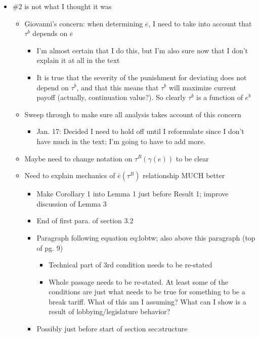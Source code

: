 \documentclass[12pt]{article}
\newcommand{\ov}{\overline}
\newcommand{\ga}{\gamma}
\begin{document}
\begin{itemize}
	\item $\#2$ is not what I thought it was
		\begin{itemize}
			\item Giovanni's concern: when determining $\ov{e}$, I need to take into account that $\tau^b$ depends on $\ov{e}$
				\begin{itemize}
					\item I'm almost certain that I do this, but I'm also sure now that I don't explain it at all in the text
					\item It is true that the severity of the punishment for deviating does not depend on $\tau^b$, and that this means that $\tau^b$ will maximize current payoff (actually, continuation value?). So clearly $\tau^b$ is a function of $e^b$
				\end{itemize}
			\item Sweep through to make sure all analysis takes account of this concern
				\begin{itemize}
					\item Jan. 17: Decided I need to hold off until I reformulate since I don't have much in the text; I'm going to have to add more.
				\end{itemize}
			\item Maybe need to change notation on $\tau^B(\ga(e))$ to be clear
			\item Need to explain mechanics of $\ov{e}(\tau^B)$ relationship MUCH better
				\begin{itemize}
					\item Make Corollary 1 into Lemma 1 just before Result 1; improve discussion of Lemma 3
					\item End of first para. of section 3.2
					\item Paragraph following equation eq:lobtw; also above this paragraph (top of pg. 9)
						\begin{itemize}
							\item Technical part of 3rd condition needs to be re-stated
							\item Whole passage needs to be re-stated. At least some of the conditions are just what needs to be true for something to be a break tariff. What of this am I assuming? What can I show is a result of lobbying/legislature behavior?
						\end{itemize}
					\item Possibly just before start of section sec:structure
				\end{itemize}
		\end{itemize}
	

\end{itemize}
\end{document}
